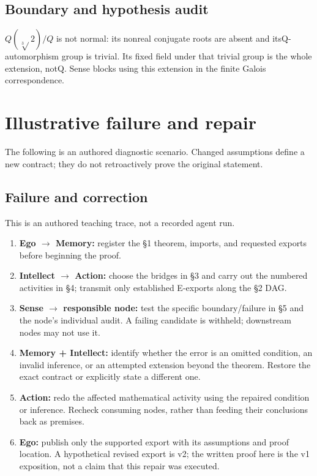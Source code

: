 \documentclass[preprint,12pt,aps,pra,showkeys,amsmath,amssymb,superscriptaddress,floatfix]{revtex4-2}
\theoremstyle{definition}
\theoremstyle{remark}
\providecommand{\tightlist}{\setlength{\itemsep}{2pt}\setlength{\parskip}{0pt}}
\begin{document}
\subsection{Boundary and hypothesis audit}

\(Q(\sqrt[3]{}2)/Q\) is not normal: its nonreal conjugate roots are
absent and itsQ-automorphism group is trivial. Its fixed field under
that trivial group is the whole extension, notQ. Sense blocks using this
extension in the finite Galois correspondence.

\section{Illustrative failure and repair}

The following is an authored diagnostic scenario. Changed assumptions
define a new contract; they do not retroactively prove the original
statement.

\subsection{Failure and correction}
This is an authored teaching trace, not a recorded agent run.

\begin{enumerate}
\def\labelenumi{\arabic{enumi}.}
\tightlist
\item
  \textbf{Ego \(\to\) Memory:} register the §1 theorem, imports, and
  requested exports before beginning the proof.
\item
  \textbf{Intellect \(\to\) Action:} choose the bridges in §3 and carry
  out the numbered activities in §4; transmit only established E-exports
  along the §2 DAG.
\item
  \textbf{Sense \(\to\) responsible node:} test the specific
  boundary/failure in §5 and the node's individual audit. A failing
  candidate is withheld; downstream nodes may not use it.
\item
  \textbf{Memory + Intellect:} identify whether the error is an omitted
  condition, an invalid inference, or an attempted extension beyond the
  theorem. Restore the exact contract or explicitly state a different
  one.
\item
  \textbf{Action:} redo the affected mathematical activity using the
  repaired condition or inference. Recheck consuming nodes, rather than
  feeding their conclusions back as premises.
\item
  \textbf{Ego:} publish only the supported export with its assumptions
  and proof location. A hypothetical revised export is v2; the written
  proof here is the v1 exposition, not a claim that this repair was
  executed.
\end{enumerate}
\end{document}
